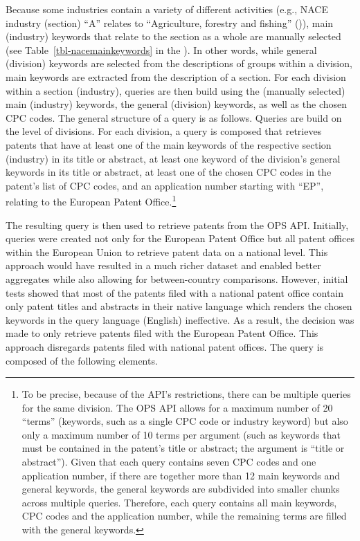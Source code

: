 \documentclass[
  11,
  a4paperpaper,
]{article}
\begin{document}
Because some industries contain a variety of different activities (e.g.,
NACE industry (section) ``A'' relates to ``Agriculture, forestry and
fishing''
()),
main (industry) keywords that relate to the section as a whole are
manually selected (see Table~\ref{tbl-nacemainkeywords} in the
). In other words, while general (division)
keywords are selected from the descriptions of groups within a division,
main keywords are extracted from the description of a section. For each
division within a section (industry), queries are then build using the
(manually selected) main (industry) keywords, the general (division)
keywords, as well as the chosen CPC codes. The general structure of a
query is as follows. Queries are build on the level of divisions. For
each division, a query is composed that retrieves patents that have at
least one of the main keywords of the respective section (industry) in
its title or abstract, at least one keyword of the division's general
keywords in its title or abstract, at least one of the chosen CPC codes
in the patent's list of CPC codes, and an application number starting
with ``EP'', relating to the European Patent Office.\footnote{To be
  precise, because of the API's restrictions, there can be multiple
  queries for the same division. The OPS API allows for a maximum number
  of 20 ``terms'' (keywords, such as a single CPC code or industry
  keyword) but also only a maximum number of 10 terms per argument (such
  as keywords that must be contained in the patent's title or abstract;
  the argument is ``title or abstract''). Given that each query contains
  seven CPC codes and one application number, if there are together more
  than 12 main keywords and general keywords, the general keywords are
  subdivided into smaller chunks across multiple queries. Therefore,
  each query contains all main keywords, CPC codes and the application
  number, while the remaining terms are filled with the general
  keywords.}

The resulting query is then used to retrieve patents from the OPS API.
Initially, queries were created not only for the European Patent Office
but all patent offices within the European Union to retrieve patent data
on a national level. This approach would have resulted in a much richer
dataset and enabled better aggregates while also allowing for
between-country comparisons. However, initial tests showed that most of
the patents filed with a national patent office contain only patent
titles and abstracts in their native language which renders the chosen
keywords in the query language (English) ineffective. As a result, the
decision was made to only retrieve patents filed with the European
Patent Office. This approach disregards patents filed with national
patent offices. The query is composed of the following elements.
\end{document}
